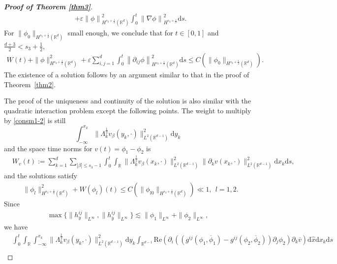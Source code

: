 \documentclass[10pt,a4paper]{amsart}
\def\leq{\leqslant}
\begin{document}
\begin{proof}[\textbf{Proof of Theorem \ref{thm3}}]
\begin{align*}
		&+\varepsilon  \left\|  \phi\right\|_{H^{s_3+\frac 12}(\mathbb{R}^d)}^2 \int_0^t\left\| \nabla\phi\right\|_{H^{s_3+\frac 12}}^2 \mathrm{d} s.
	\end{align*}
	For $ \|\phi_0\|_{H^{s_3+\frac12}(\mathbb{R}^{d})} $ small enough, we conclude that for \(t \in [0,1]\) and \(\frac{d+3}{2} < s_3 + \frac12\),
	\begin{align*} 
		W(t) +\|\phi\|_{H^{s_3+\frac12}(\mathbb{R}^{d})}^2+\varepsilon  \sum_{i,j=1}^d\int_0^t\left\| \partial_{ij}\phi\right\|_{H^{s_3+\frac 12}(\mathbb{R}^d)}^2 \mathrm{d} s \leq C\left(\|\phi_0\|_{H^{s_3+\frac12}(\mathbb{R}^{d})}\right).
	\end{align*}
	The existence of a solution follows by an argument similar to that in the proof of Theorem~\ref{thm2}.
	 
	 The proof of the uniqueness and continuity of the solution  is also similar with the quadratic interaction problem except the following points.  The weight to multiply by \eqref{consm1-2} is still
 $$ \int_{-\infty}^{x_k} \|\Lambda_k^{\frac 12}v_{\beta}(y_k,\cdot)\|^2_{L^2(\mathbb{R}^{d-1})} \mathrm{d} y_k  $$ and the space time norms for $ v(t) =\phi_1 -\phi_2$ is
	 \begin{align*}
	 	&W_v(t)	
	 	:=\sum_{k=1}^d\sum_{|\beta|\leq s_3-1} \int_0^t \int_{\mathbb{R}}  \| \Lambda_k^{\frac 12}v_{\beta}(x_k,\cdot)\|_{L^2(\mathbb{R}^{d-1})}^2  \|\partial_k v (x_k,\cdot)\|_{L^2(\mathbb{R}^{d-1})}^2 \mathrm{d} x_k \mathrm{d} s,
	 \end{align*}
	 and  
	 the solutions satisfy
	 \begin{align*}
	 	\label{csol1-2}
	 	&	\|\phi_l\|_{H^{s_3+\frac12}(\mathbb{R}^{d})}^2+	W(\phi_l)(t) \leq C\left(\|\phi_{l0}\|_{H^{s_3+\frac12}(\mathbb{R}^{d})}\right)\ll 1,~~l=1,2.
	 \end{align*}
	 Since 
	 \begin{align*}
	 	\max\{ \|h^{ij}_y\|_{L^{\infty}}, \|h^{ij}_{\overline{y}}\|_{L^{\infty}}\} \lesssim  \| \phi_1\|_{L^{\infty}}+\| \phi_2\|_{L^{\infty}},
	 \end{align*}
we have
	 \begin{align}
	 	&\int_0^t \int_{\mathbb{R}}\int_{-\infty}^{x_k} \|\Lambda_k^{\frac 12}v_{\beta}(y_k,\cdot)\|^2_{L^2(\mathbb{R}^{d-1})} \mathrm{d} y_k	\int_{\mathbb{R}^{d-1}} \mathrm{Re} \left(\partial_i\left( (g^{ij}\left(\phi_1,\overline{\phi}_1\right)-g^{ij}\left(\phi_2,\overline{\phi}_2\right)) \partial_j\phi_2\right)\partial_k \overline{v} \right)   \mathrm{d} \hat{x}  \mathrm{d} x_k \mathrm{d}s\nonumber\\

\end{align}
\end{proof}
\end{document}

